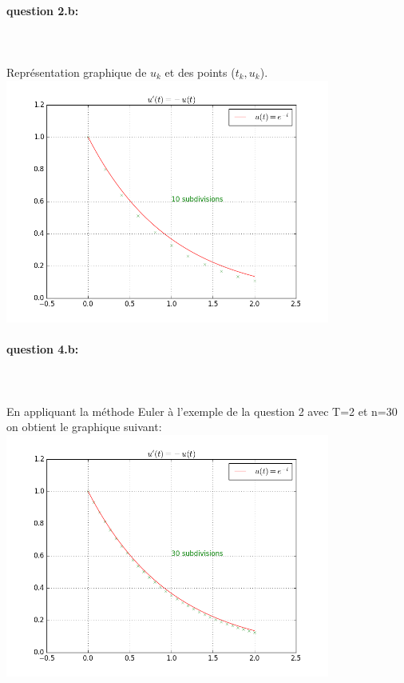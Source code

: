 \documentclass{article}
\begin{document}
\paragraph{question 2.b:}
~~\\
\\
Représentation graphique de $u_k$ et des points ($t_k, u_k$).
\\
\includegraphics[height=8cm]{u1_10.png}

\paragraph{question 4.b:}
~~\\
\\
En appliquant la méthode Euler à l'exemple de la question 2 avec T=2 et n=30 on obtient le graphique suivant:
\\
\includegraphics[height=8cm]{u1_30.png}
\\
\end{document}

